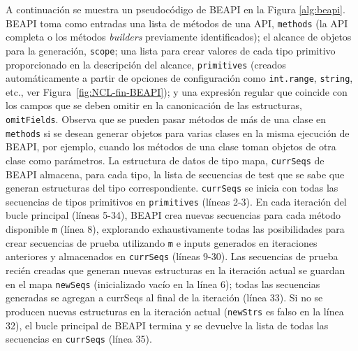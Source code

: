 A continuación se muestra un pseudocódigo de \textsf{BEAPI} en la Figura \ref{alg:beapi}. \textsf{BEAPI} toma como entradas una lista de métodos de una API,  \texttt{methods} (la API completa o los métodos \emph{builders} previamente identificados); el alcance de objetos para la generación, \texttt{scope}; una lista para crear valores de cada tipo primitivo proporcionado en la descripción del alcance, \texttt{primitives} (creados automáticamente a partir de opciones de configuración como \texttt{int.range}, \texttt{string}, etc., ver Figura~\ref{fig:NCL-fin-BEAPI}); y una expresión regular que coincide con los campos que se deben omitir en la canonicación de las estructuras, \texttt{omitFields}. Observa que se pueden pasar métodos de más de una clase en \texttt{methods} si se desean generar objetos para varias clases en la misma ejecución de \textsf{BEAPI}, por ejemplo, cuando los métodos de una clase toman objetos de otra clase como parámetros. La estructura de datos de tipo mapa, \texttt{currSeqs} de \textsf{BEAPI}  almacena, para cada tipo, la lista de secuencias de test que se sabe que generan estructuras del tipo correspondiente. \texttt{currSeqs} se inicia con todas las secuencias de tipos primitivos en \texttt{primitives} (líneas 2-3). En cada iteración del bucle principal (líneas 5-34), \textsf{BEAPI}  crea nuevas secuencias para cada método disponible \texttt{m} (línea 8), explorando exhaustivamente todas las posibilidades para crear secuencias de prueba utilizando \texttt{m} e inputs generados en iteraciones anteriores y almacenados en \texttt{currSeqs} (líneas 9-30). Las secuencias de prueba recién creadas que generan nuevas estructuras en la iteración actual se guardan en el mapa \texttt{newSeqs} (inicializado vacío en la línea 6); todas las secuencias generadas se agregan a currSeqs al final de la iteración (línea 33). Si no se producen nuevas estructuras en la iteración actual (\texttt{newStrs} es falso en la línea 32), el bucle principal de \textsf{BEAPI}  termina y se devuelve la lista de todas las secuencias en \texttt{currSeqs} (línea 35).


